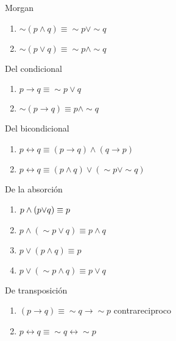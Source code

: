 \begin{ley}{Morgan}
\begin{enumerate}
\item $\sim\left(p\wedge q\right)\equiv\sim p\vee\sim q$
\item $\sim\left(p\vee q\right)\equiv\sim p\wedge\sim q$
\end{enumerate}
\end{ley}

\begin{ley}{Del condicional}
\begin{enumerate}
\item $p\rightarrow q\equiv\sim p\vee q$
\item $\sim\left(p\rightarrow q\right)\equiv p\wedge\sim q$
\end{enumerate}
\end{ley}

\begin{ley}{Del bicondicional}
\begin{enumerate}
\item $p\leftrightarrow q\equiv\left(p\rightarrow q\right)\wedge\left(q\rightarrow p\right)$
\item $p\leftrightarrow q\equiv\left(p\wedge q\right)\vee\left(\sim p\vee\sim q\right)$
\end{enumerate}
\end{ley}

\begin{ley}{De la absorción}
\begin{enumerate}
\item $p\wedge\left(p\text{\ensuremath{\vee}\ensuremath{q}}\right)\equiv p$
\item $p\wedge\left(\sim p\vee q\right)\equiv p\wedge q$
\item $p\vee\left(p\wedge q\right)\equiv p$
\item $p\vee\left(\sim p\wedge q\right)\equiv p\vee q$
\end{enumerate}
\end{ley}

\begin{ley}{De transposición}
\begin{enumerate}
\item $\left(p\rightarrow q\right)\equiv\sim q\rightarrow\sim p$ contrareciproco
\item $p\leftrightarrow q\equiv\sim q\leftrightarrow\sim p$
\end{enumerate}
\end{ley}

